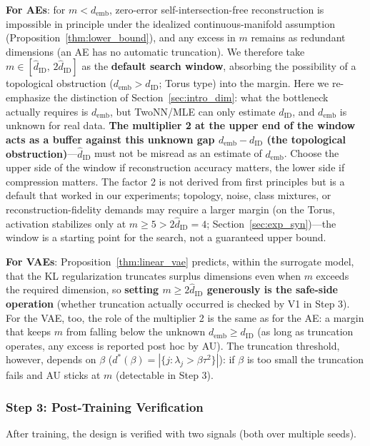\documentclass[make,article,submit,pdftex,moreauthors]{Definitions/mdpi}
\newcommand{\dID}{d_{\mathrm{ID}}}
\newcommand{\hatdID}{\hat{d}_{\mathrm{ID}}}
\newcommand{\demb}{d_{\mathrm{emb}}}
\newcommand{\dstar}{d^{*}(\beta)}
\begin{document}
\textbf{For AEs}: for $m < \demb$, zero-error self-intersection-free
reconstruction is impossible in principle under the idealized
continuous-manifold assumption
(Proposition~\ref{thm:lower_bound}), and any excess
in $m$ remains as redundant dimensions (an AE has no automatic truncation).
We therefore take $m \in [\hatdID,\, 2\hatdID]$ as the \textbf{default
search window}, absorbing the possibility of a topological obstruction
($\demb > \dID$; Torus type) into the margin.
Here we re-emphasize the distinction of
Section~\ref{sec:intro_dim}: what the bottleneck actually requires is
$\demb$, but TwoNN/MLE can only estimate $\dID$, and $\demb$ is unknown for
real data.
\textbf{The multiplier 2 at the upper end of the window acts as a buffer
against this unknown gap $\demb - \dID$ (the topological
obstruction)}---$\hatdID$ must not be misread as an estimate of $\demb$.
Choose the upper side of the window if reconstruction accuracy matters, the
lower side if compression matters.
The factor 2 is not derived from first principles but is a default that
worked in our experiments; topology, noise, class mixtures, or
reconstruction-fidelity demands may require a larger margin (on the Torus,
activation stabilizes only at $m \geq 5 > 2\hatdID = 4$;
Section~\ref{sec:exp_syn})---the window is a starting point for the search,
not a guaranteed upper bound.

\textbf{For VAEs}: Proposition~\ref{thm:linear_vae} predicts, within the
surrogate model, that the KL regularization truncates surplus dimensions
even when $m$ exceeds the required dimension, so
\textbf{setting $m \geq 2\hatdID$ generously is the safe-side operation}
(whether truncation actually occurred is checked by V1 in Step 3).
For the VAE, too, the role of the multiplier 2 is the same as for the AE: a
margin that keeps $m$ from falling below the unknown $\demb \geq \dID$ (as
long as truncation operates, any excess is reported post hoc by AU).
The truncation threshold, however, depends on $\beta$
($\dstar = |\{j : \lambda_j > \beta\tau^2\}|$): if $\beta$ is too small the
truncation fails and AU sticks at $m$ (detectable in Step 3).

\subsubsection{Step 3: Post-Training Verification}\label{sec:protocol_s3}

After training, the design is verified with two signals (both over multiple
seeds).
\end{document}
